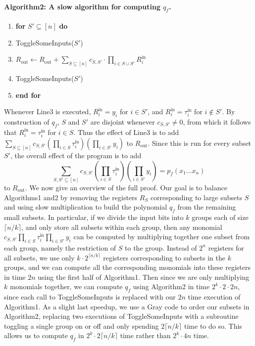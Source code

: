 \documentclass[10pt,a4paper]{article}
\begin{document}
\paragraph{Algorithm2: A slow algorithm for computing $q_f$.}
\begin{enumerate}[label=\arabic*:]
\item \textbf{for} $S'\subseteq[n]$ \textbf{do}
\item ToggleSomeInputs($S'$)
\item $R_{\mathrm{out}}\leftarrow R_{\mathrm{out}}+\sum_{S\subseteq[n]}c_{S,S'}\cdot\prod_{i\in S\cup S'}R_i^{\mathrm{in}}$
\item ToggleSomeInputs($S'$)
\item \textbf{end for}
\end{enumerate}
Whenever Line3 is executed, $R_i^{\mathrm{in}}=y_i$ for $i\in S'$, and $R_i^{\mathrm{in}}=\tau_i^{\mathrm{in}}$ for $i\notin S'$. By construction of $q_f$, $S$ and $S'$ are disjoint whenever $c_{S,S'}\neq0$, from which it follows that $R_i^{\mathrm{in}}=\tau_i^{\mathrm{in}}$ for $i\in S$. Thus the effect of Line3 is to add $\sum_{S\subseteq[n]}c_{S,S'}(\prod_{i\in S}\tau_i^{\mathrm{in}})(\prod_{i\in S'}y_i)$ to $R_{\mathrm{out}}$. Since this is run for every subset $S'$, the overall effect of the program is to add
\[\sum_{S,S'\subseteq[n]}c_{S,S'}\left(\prod_{i\in S}\tau_i^{\mathrm{in}}\right)\left(\prod_{i\in S'}y_i\right)=p_f(x_1\ldots x_n)\]
to $R_{\mathrm{out}}$.
We now give an overview of the full proof. Our goal is to balance Algorithms1 and2 by removing the registers $R_S$ corresponding to large subsets $S$ and using slow multiplication to build the polynomial $q_f$ from the remaining small subsets. In particular, if we divide the input bits into $k$ groups each of size $\lceil n/k\rceil$, and only store all subsets within each group, then any monomial $c_{S,S'}\prod_{i\in S}\tau_i^{\mathrm{in}}\prod_{i\in S'}y_i$ can be computed by multiplying together one subset from each group, namely the restriction of $S$ to the group. Instead of $2^n$ registers for all subsets, we use only $k\cdot2^{\lceil n/k\rceil}$ registers corresponding to subsets in the $k$ groups, and we can compute all the corresponding monomials into these registers in time $2n$ using the first half of Algorithm1. Then since we are only multiplying $k$ monomials together, we can compute $q_f$ using Algorithm2 in time $2^k\cdot2\cdot2n$, since each call to ToggleSomeInputs is replaced with our $2n$ time execution of Algorithm1.
As a slight last speedup, we use a Gray code to order our subsets in Algorithm2, replacing two executions of ToggleSomeInputs with a subroutine toggling a single group on or off and only spending $2\lceil n/k\rceil$ time to do so. This allows us to compute $q_f$ in $2^k\cdot2\lceil n/k\rceil$ time rather than $2^k\cdot4n$ time.
\end{document}
